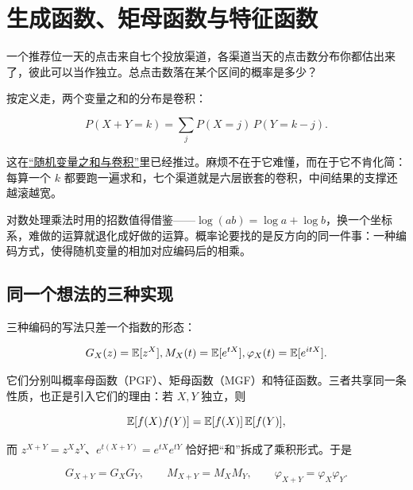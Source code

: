 \section{生成函数、矩母函数与特征函数}
\label{sec:05-Probability/07-Transforms-and-Bounds/01}

一个推荐位一天的点击来自七个投放渠道，各渠道当天的点击数分布你都估出来了，彼此可以当作独立。总点击数落在某个区间的概率是多少？

按定义走，两个变量之和的分布是卷积：

\[
P(X+Y=k)=\sum_{j} P(X=j)\,P(Y=k-j).
\]

这在\hyperref[sec:05-Probability/05-Joint-Distributions/03]{``随机变量之和与卷积''}里已经推过。麻烦不在于它难懂，而在于它不肯化简：每算一个 \(k\) 都要跑一遍求和，七个渠道就是六层嵌套的卷积，中间结果的支撑还越滚越宽。

对数处理乘法时用的招数值得借鉴——\(\log(ab)=\log a+\log b\)，换一个坐标系，难做的运算就退化成好做的运算。概率论要找的是反方向的同一件事：一种编码方式，使得随机变量的相加对应编码后的相乘。

\subsection{同一个想法的三种实现}

三种编码的写法只差一个指数的形态：

\[
G_X(z)=\mathbb{E}[z^X],\space
M_X(t)=\mathbb{E}[e^{tX}],\space
\varphi_X(t)=\mathbb{E}[e^{itX}].
\]

它们分别叫概率母函数（PGF）、矩母函数（MGF）和特征函数。三者共享同一条性质，也正是引入它们的理由：若 \(X,Y\) 独立，则

\[
\mathbb{E}[f(X)f(Y)]=\mathbb{E}[f(X)]\,\mathbb{E}[f(Y)],
\]

而 \(z^{X+Y}=z^Xz^Y\)、\(e^{t(X+Y)}=e^{tX}e^{tY}\) 恰好把``和''拆成了乘积形式。于是

\[
G_{X+Y}=G_XG_Y,\qquad M_{X+Y}=M_XM_Y,\qquad \varphi_{X+Y}=\varphi_X\varphi_Y.
\]

